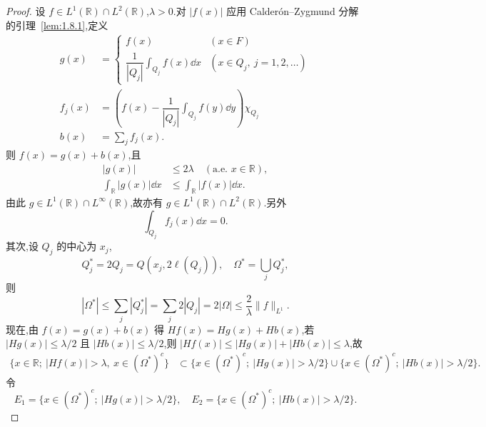 \begin{proof}
设 $f \in L^{1}(\mathbb{R}) \cap L^{2}(\mathbb{R})$,$\lambda > 0$.对 $|f(x)|$ 应用 Calderón--Zygmund 分解的引理~\ref{lem:1.8.1},定义
\begin{align*}
g(x) &= \begin{cases} f(x) & (x \in F) \\ \dfrac{1}{|Q_{j}|}\displaystyle\int_{Q_{j}} f(x)\dd x & (x \in Q_{j},\ j = 1, 2, \dots) \end{cases} \\[10pt]
f_{j}(x) &= \left(f(x) - \dfrac{1}{|Q_{j}|}\displaystyle\int_{Q_{j}} f(y)\dd y\right)\chi_{Q_{j}} \\[8pt]
b(x) &= \displaystyle\sum_{j} f_{j}(x).
\end{align*}
则 $f(x) = g(x) + b(x)$,且
\begin{equation*}
\begin{aligned}
|g(x)| &\leq 2\lambda \quad (\text{a.e. } x \in \mathbb{R}), \\
\int_{\mathbb{R}}|g(x)|\dd x &\leq \int_{\mathbb{R}}|f(x)|\dd x.
\end{aligned}
\end{equation*}
由此 $g \in L^{1}(\mathbb{R}) \cap L^{\infty}(\mathbb{R})$,故亦有 $g \in L^{1}(\mathbb{R}) \cap L^{2}(\mathbb{R})$.另外
\begin{equation*}
\int_{Q_{j}} f_{j}(x)\dd x = 0.
\end{equation*}
其次,设 $Q_{j}$ 的中心为 $x_{j}$,
\begin{equation*}
Q_{j}^{*} = 2Q_{j} = Q(x_{j}, 2\ell(Q_{j})), \quad \Omega^{*} = \bigcup_{j} Q_{j}^{*},
\end{equation*}
则
\begin{equation}\tag{1.8.3}
|\Omega^{*}| \leq \sum_{j}|Q_{j}^{*}| = \sum_{j} 2|Q_{j}| = 2|\Omega| \leq \frac{2}{\lambda}\| f \|_{L^{1}}.
\label{eq:1.8.3}\end{equation}
现在,由 $f(x) = g(x) + b(x)$ 得 $Hf(x) = Hg(x) + Hb(x)$,若 $|Hg(x)| \leq \lambda/2$ 且 $|Hb(x)| \leq \lambda/2$,则 $|Hf(x)| \leq |Hg(x)| + |Hb(x)| \leq \lambda$,故
\begin{align*}
\{x \in \mathbb{R};\ |Hf(x)| > \lambda,\ x \in (\Omega^{*})^{c}\}&\subset \{x \in (\Omega^{*})^{c};\ |Hg(x)| > \lambda/2\} \cup \{x \in (\Omega^{*})^{c};\ |Hb(x)| > \lambda/2\}.
 \end{align*}
令
\begin{equation*}
E_{1} = \{x \in (\Omega^{*})^{c};\ |Hg(x)| > \lambda/2\}, \quad E_{2} = \{x \in (\Omega^{*})^{c};\ |Hb(x)| > \lambda/2\}.
\end{equation*}

\end{proof}
